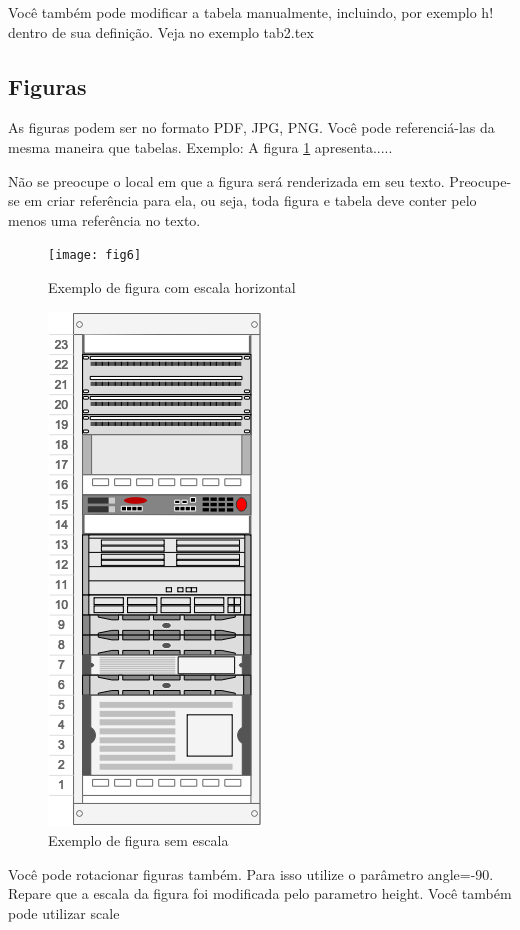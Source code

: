 \documentclass[	DIV=calc,%
paper=a4,%
fontsize=12pt,%
onecolumn]{scrartcl}	 					%
\begin{document}
	
	Você também pode modificar a tabela manualmente, incluindo, por exemplo h! dentro de sua definição. Veja no exemplo tab2.tex
	
	\subsection{Figuras}
	
	As figuras podem ser no formato PDF, JPG, PNG. Você pode referenciá-las da mesma maneira que tabelas. Exemplo: A figura \ref{fig6} apresenta.....
	
	Não se preocupe o local em que a figura será renderizada em seu texto. Preocupe-se em criar referência para ela, ou seja, toda figura e tabela deve conter pelo menos uma referência no texto.
	
	\begin{figure}
		\centering
		\texttt{[image: fig6]}
		\caption{Exemplo de figura com escala horizontal}
		\label{fig6}
	\end{figure}
	
	
	\begin{figure}
		\centering
		\includegraphics[]{fig2}
		\caption{Exemplo de figura sem escala}
		\label{fig2}
	\end{figure}
	
	Você pode rotacionar figuras também. Para isso utilize o parâmetro angle=-90. Repare que a escala da figura foi modificada pelo parametro height. Você também pode utilizar scale
	
\end{document}
